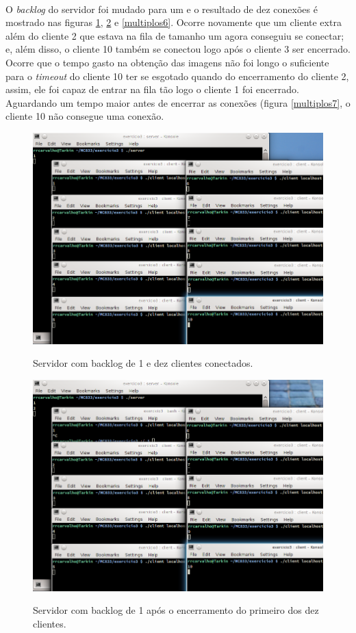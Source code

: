 \documentclass[a4paper,10pt,oneside,final,titlepage,onecolumn]{article}
\begin{document}
\paragraph{}O \emph{backlog} do servidor foi mudado para um e o resultado de dez conexões é mostrado nas figuras \ref{multiplos4}, \ref{multiplos5} e \ref{multiplos6}. Ocorre novamente que um cliente extra além do cliente 2 que estava na fila de tamanho um agora conseguiu se conectar; e, além disso, o cliente 10 também se conectou logo após o cliente 3 ser encerrado. Ocorre que o tempo gasto na obtenção das imagens não foi longo o suficiente para o \emph{timeout} do cliente 10 ter se esgotado quando do encerramento do cliente 2, assim, ele foi capaz de entrar na fila tão logo o cliente 1 foi encerrado. Aguardando um tempo maior antes de encerrar as conexões (figura \ref{multiplos7}, o cliente 10 não consegue uma conexão.
\begin{figure}[!ht]
  \caption{Servidor com backlog de 1 e dez clientes conectados.}
  \centering
  \includegraphics[width=117mm]{images/multiplos4.png}
  \label{multiplos4}
\end{figure}
\begin{figure}[!ht]
  \caption{Servidor com backlog de 1 após o encerramento do primeiro dos dez clientes.}
  \centering
  \includegraphics[width=117mm]{images/multiplos5.png}
  \label{multiplos5}
\end{figure}
\end{document}
